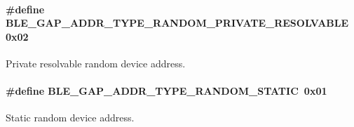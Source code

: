\paragraph[{\texorpdfstring{B\+L\+E\+\_\+\+G\+A\+P\+\_\+\+A\+D\+D\+R\+\_\+\+T\+Y\+P\+E\+\_\+\+R\+A\+N\+D\+O\+M\+\_\+\+P\+R\+I\+V\+A\+T\+E\+\_\+\+R\+E\+S\+O\+L\+V\+A\+B\+LE}{BLE_GAP_ADDR_TYPE_RANDOM_PRIVATE_RESOLVABLE}}]{\setlength{\rightskip}{0pt plus 5cm}\#define B\+L\+E\+\_\+\+G\+A\+P\+\_\+\+A\+D\+D\+R\+\_\+\+T\+Y\+P\+E\+\_\+\+R\+A\+N\+D\+O\+M\+\_\+\+P\+R\+I\+V\+A\+T\+E\+\_\+\+R\+E\+S\+O\+L\+V\+A\+B\+LE~0x02}\hypertarget{group___b_l_e___g_a_p___a_d_d_r___t_y_p_e_gae166d654401b0ed83ad7073f31467b70}{}\label{group___b_l_e___g_a_p___a_d_d_r___t_y_p_e_gae166d654401b0ed83ad7073f31467b70}
Private resolvable random device address. 
\paragraph[{\texorpdfstring{B\+L\+E\+\_\+\+G\+A\+P\+\_\+\+A\+D\+D\+R\+\_\+\+T\+Y\+P\+E\+\_\+\+R\+A\+N\+D\+O\+M\+\_\+\+S\+T\+A\+T\+IC}{BLE_GAP_ADDR_TYPE_RANDOM_STATIC}}]{\setlength{\rightskip}{0pt plus 5cm}\#define B\+L\+E\+\_\+\+G\+A\+P\+\_\+\+A\+D\+D\+R\+\_\+\+T\+Y\+P\+E\+\_\+\+R\+A\+N\+D\+O\+M\+\_\+\+S\+T\+A\+T\+IC~0x01}\hypertarget{group___b_l_e___g_a_p___a_d_d_r___t_y_p_e_gabe27b8f22c3a52413fa064c2ee1e4fba}{}\label{group___b_l_e___g_a_p___a_d_d_r___t_y_p_e_gabe27b8f22c3a52413fa064c2ee1e4fba}
Static random device address. 